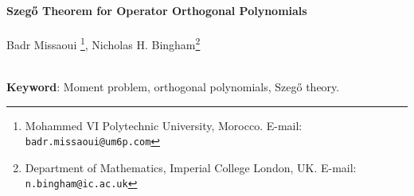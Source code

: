 \documentclass[11pt]{article}
\begin{document}






            	\renewcommand{\thefootnote}{\arabic{footnote}}
	\begin{center}
		{\Large \textbf{ Szeg\H{o} Theorem for Operator Orthogonal Polynomials}} \\[0pt]
		~\\[0pt] Badr Missaoui \footnote[1]{Mohammed VI Polytechnic University, Morocco. E-mail: \texttt{badr.missaoui@um6p.com}}, Nicholas H. Bingham{\footnote[2]{Department of Mathematics, Imperial College London, UK.
				E-mail: \texttt{n.bingham@ic.ac.uk}}}
		\\[0pt]
		
		
		~\\[0pt]
	\end{center}



\begin{abstract}
We develop a Szeg\H{o} theory for operator-valued measures on the unit circle, extending the framework of matrix orthogonal polynomials to the infinite-dimensional setting. Our approach yields a new and direct proof of the operator Szeg\H{o} limit theorem based solely on orthogonal-polynomial theory.
\end{abstract}

{\bf Keyword}: Moment problem, orthogonal polynomials, Szeg\H{o} theory.
\end{document}
